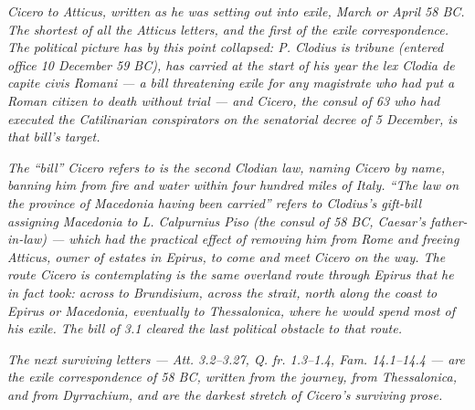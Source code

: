 
\textit{Cicero to Atticus, written as he was setting out into
exile, March or April 58 BC. The shortest of all the
Atticus letters, and the first of the exile correspondence.
The political picture has by this point collapsed: P.
Clodius is tribune (entered office 10 December 59 BC), has
carried at the start of his year the lex Clodia de capite
civis Romani --- a bill threatening exile for any magistrate
who had put a Roman citizen to death without trial --- and
Cicero, the consul of 63 who had executed the Catilinarian
conspirators on the senatorial decree of 5 December, is
that bill's target.}

\textit{The ``bill'' Cicero refers to is the second Clodian
law, naming Cicero by name, banning him from fire and water
within four hundred miles of Italy. ``The law on the province
of Macedonia having been carried'' refers to Clodius's
gift-bill assigning Macedonia to L. Calpurnius Piso (the
consul of 58 BC, Caesar's father-in-law) --- which had the
practical effect of removing him from Rome and freeing
Atticus, owner of estates in Epirus, to come and meet Cicero
on the way. The route Cicero is contemplating is the same
overland route through Epirus that he in fact took: across
to Brundisium, across the strait, north along the coast to
Epirus or Macedonia, eventually to Thessalonica, where he
would spend most of his exile. The bill of 3.1 cleared the
last political obstacle to that route.}

\textit{The next surviving letters --- \textit{Att.} 3.2--3.27,
\textit{Q. fr.} 1.3--1.4, \textit{Fam.} 14.1--14.4 --- are the
exile correspondence of 58 BC, written from the journey,
from Thessalonica, and from Dyrrachium, and are the darkest
stretch of Cicero's surviving prose.}

